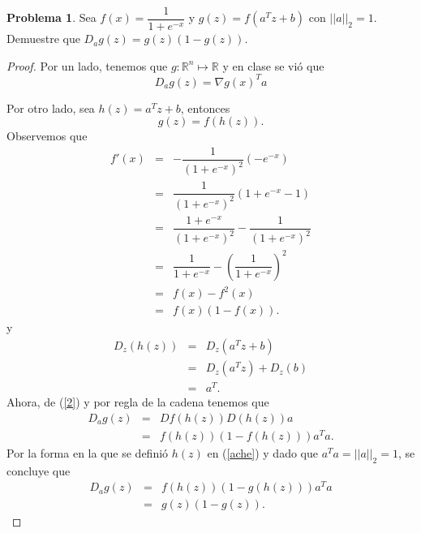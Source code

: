 \documentclass[12pt,letterpaper]{article}
\theoremstyle{definition}
\newtheorem{problm}{Problema}
\begin{document}
\begin{problm}
	Sea $ f(x) = \dfrac{1}{1+e^{-x}} $ y $ g(z) = f(a^T z + b) $ con $ ||a||_2 = 1 $. Demuestre que $ D_a g(z) = g(z) (1-g(z)) $.
	\begin{proof}
		Por un lado, tenemos que $ g: \mathbb{R}^n \mapsto \mathbb{R} $ y en clase se vió que
		\begin{equation}\label{2}
			D_a g(z) = \nabla g(x)^T a
		\end{equation}
	
	Por otro lado, sea $ h(z) = a^T z + b $, entonces
	\begin{equation}\label{ache}
		g(z) = f(h(z)).
	\end{equation}
	Observemos que
	\begin{eqnarray*}
		f'(x) & = & -\dfrac{1}{(1+e^{-x})^2} (-e^{-x}) \\
			  & = & \dfrac{1}{(1+e^{-x})^2} ( 1 + e^{-x} - 1) \\
			  & = & \dfrac{1 + e^{-x}}{(1+e^{-x})^2} - \dfrac{1}{(1+e^{-x})^2} \\
			  & = & \dfrac{1}{1+e^{-x}} - \left(\dfrac{1}{1+e^{-x}}\right)^2 \\
			  & = & f(x) - f^2(x) \\
			  & = & f(x) (1-f(x)).
	\end{eqnarray*}
	y
	\begin{eqnarray*}
		D_z(h(z)) & = & D_z(a^T z + b) \\
		 		 & = & D_z(a^Tz) + D_z(b) \\
		 		 & = & a^T.
	\end{eqnarray*}
	Ahora, de (\ref{2}) y por regla de la cadena tenemos que
	\begin{eqnarray*}
		 D_a g(z) & = & D f(h(z)) D (h(z)) a \\
		          & = & f(h(z)) (1-f(h(z))) a^T a.
	\end{eqnarray*}
	Por la forma en la que se definió $ h(z) $ en (\ref{ache}) y dado que $ a^T a = || a ||_2 = 1 $, se concluye que
	\begin{eqnarray*}
		D_a g(z) & = & f(h(z)) (1-g(h(z))) a^T a \\
				 & = & g(z) (1-g(z)).
	\end{eqnarray*}
	\end{proof}
\end{problm}
\end{document}
